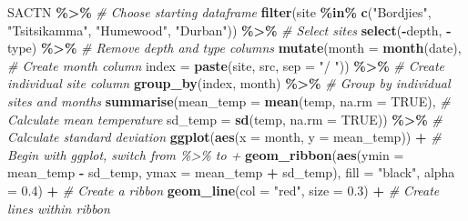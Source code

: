 \documentclass[
]{book}
\newenvironment{Shaded}{\begin{snugshade}}{\end{snugshade}}
\newcommand{\CommentTok}[1]{\textcolor[rgb]{0.56,0.35,0.01}{\textit{#1}}}
\newcommand{\DataTypeTok}[1]{\textcolor[rgb]{0.13,0.29,0.53}{#1}}
\newcommand{\FloatTok}[1]{\textcolor[rgb]{0.00,0.00,0.81}{#1}}
\newcommand{\KeywordTok}[1]{\textcolor[rgb]{0.13,0.29,0.53}{\textbf{#1}}}
\newcommand{\NormalTok}[1]{#1}
\newcommand{\OperatorTok}[1]{\textcolor[rgb]{0.81,0.36,0.00}{\textbf{#1}}}
\newcommand{\OtherTok}[1]{\textcolor[rgb]{0.56,0.35,0.01}{#1}}
\newcommand{\StringTok}[1]{\textcolor[rgb]{0.31,0.60,0.02}{#1}}
\begin{document}
\begin{Shaded}
\begin{Highlighting}[]
\NormalTok{SACTN }\OperatorTok{\%>\%}\StringTok{ }\CommentTok{\# Choose starting dataframe}
\StringTok{  }\KeywordTok{filter}\NormalTok{(site }\OperatorTok{\%in\%}\StringTok{ }\KeywordTok{c}\NormalTok{(}\StringTok{"Bordjies"}\NormalTok{, }\StringTok{"Tsitsikamma"}\NormalTok{, }\StringTok{"Humewood"}\NormalTok{, }\StringTok{"Durban"}\NormalTok{)) }\OperatorTok{\%>\%}\StringTok{ }\CommentTok{\# Select sites}
\StringTok{  }\KeywordTok{select}\NormalTok{(}\OperatorTok{{-}}\NormalTok{depth, }\OperatorTok{{-}}\NormalTok{type) }\OperatorTok{\%>\%}\StringTok{ }\CommentTok{\# Remove depth and type columns}
\StringTok{  }\KeywordTok{mutate}\NormalTok{(}\DataTypeTok{month =} \KeywordTok{month}\NormalTok{(date), }\CommentTok{\# Create month column}
         \DataTypeTok{index =} \KeywordTok{paste}\NormalTok{(site, src, }\DataTypeTok{sep =} \StringTok{"/ "}\NormalTok{)) }\OperatorTok{\%>\%}\StringTok{ }\CommentTok{\# Create individual site column}
\StringTok{  }\KeywordTok{group\_by}\NormalTok{(index, month) }\OperatorTok{\%>\%}\StringTok{ }\CommentTok{\# Group by individual sites and months}
\StringTok{  }\KeywordTok{summarise}\NormalTok{(}\DataTypeTok{mean\_temp =} \KeywordTok{mean}\NormalTok{(temp, }\DataTypeTok{na.rm =} \OtherTok{TRUE}\NormalTok{), }\CommentTok{\# Calculate mean temperature}
            \DataTypeTok{sd\_temp =} \KeywordTok{sd}\NormalTok{(temp, }\DataTypeTok{na.rm =} \OtherTok{TRUE}\NormalTok{)) }\OperatorTok{\%>\%}\StringTok{ }\CommentTok{\# Calculate standard deviation}
\StringTok{  }\KeywordTok{ggplot}\NormalTok{(}\KeywordTok{aes}\NormalTok{(}\DataTypeTok{x =}\NormalTok{ month, }\DataTypeTok{y =}\NormalTok{ mean\_temp)) }\OperatorTok{+}\StringTok{ }\CommentTok{\# Begin with ggplot, switch from \textquotesingle{}\%>\%\textquotesingle{} to \textquotesingle{}+\textquotesingle{}}
\StringTok{  }\KeywordTok{geom\_ribbon}\NormalTok{(}\KeywordTok{aes}\NormalTok{(}\DataTypeTok{ymin =}\NormalTok{ mean\_temp }\OperatorTok{{-}}\StringTok{ }\NormalTok{sd\_temp, }\DataTypeTok{ymax =}\NormalTok{ mean\_temp }\OperatorTok{+}\StringTok{ }\NormalTok{sd\_temp), }
              \DataTypeTok{fill =} \StringTok{"black"}\NormalTok{, }\DataTypeTok{alpha =} \FloatTok{0.4}\NormalTok{) }\OperatorTok{+}\StringTok{ }\CommentTok{\# Create a ribbon}
\StringTok{  }\KeywordTok{geom\_line}\NormalTok{(}\DataTypeTok{col =} \StringTok{"red"}\NormalTok{, }\DataTypeTok{size =} \FloatTok{0.3}\NormalTok{) }\OperatorTok{+}\StringTok{ }\CommentTok{\# Create lines within ribbon}

\end{Highlighting}
\end{Shaded}
\end{document}
